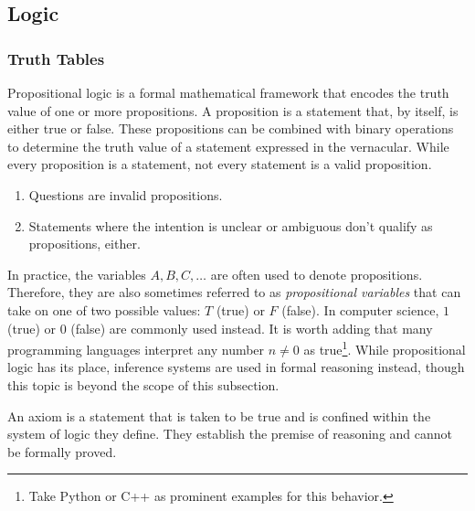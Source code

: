 \subsection{Logic}\label{subsec-logic}


\subsubsection{Truth Tables}\label{subsubsec-truth-table}

Propositional logic is a formal mathematical framework that encodes the truth value
of one or more propositions. A proposition is a statement that, by itself, is either
true or false. These propositions can be combined with binary operations to determine
the truth value of a statement expressed in the vernacular. While every proposition
is a statement, not every statement is a valid proposition.

\begin{enumerate}
    \item Questions are invalid propositions.
    \item Statements where the intention is unclear or ambiguous don't qualify as propositions, either.
\end{enumerate}

In practice, the variables \(A,B,C,\dots\) are often used to denote propositions.
Therefore, they are also sometimes referred to as \emph{propositional variables}
that can take on one of two possible values: \(T\) (true) or \(F\) (false). In
computer science, \(1\) (true) or \(0\) (false) are commonly used instead. It is
worth adding that many programming languages interpret any number \(n\neq0\) as
true\footnote{Take Python or C++ as prominent examples for this behavior.}. While
propositional logic has its place, inference systems are used in formal reasoning
instead, though this topic is beyond the scope of this subsection.

\begin{definition}\label{def-axiom}
    An axiom is a statement that is taken to be true and is confined within the
    system of logic they define. They establish the premise of reasoning and cannot
    be formally proved.
\end{definition}

